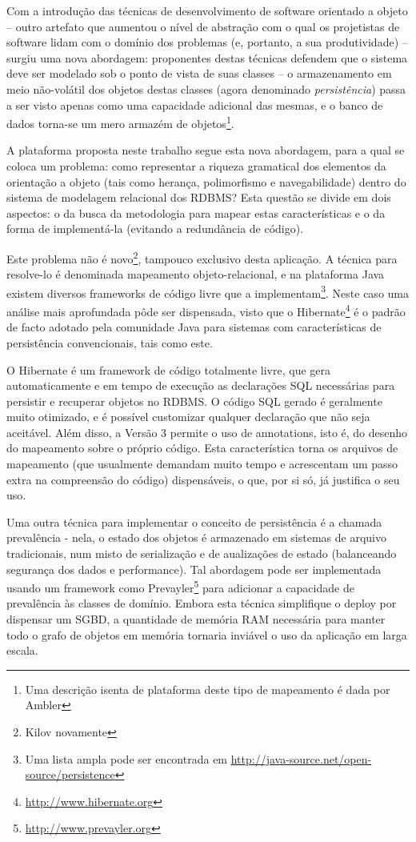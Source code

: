 \documentclass{abnt}
\begin{document}
Com a introdução das técnicas de desenvolvimento de software orientado a objeto – outro artefato que aumentou o nível de abstração com o qual os projetistas de software lidam com o domínio dos problemas (e, portanto, a sua produtividade) – surgiu uma nova abordagem: proponentes destas técnicas defendem que o sistema deve ser modelado sob o ponto de vista de suas classes – o armazenamento em meio não-volátil dos objetos destas classes (agora denominado \textit{persistência}) passa a ser visto apenas como uma capacidade adicional das mesmas, e o banco de dados torna-se um mero armazém de objetos\footnote{Uma descrição isenta de plataforma deste tipo de mapeamento é dada por Ambler\cite{web:ambler}}.

A plataforma proposta neste trabalho segue esta nova abordagem, para a qual se coloca um problema: como representar a riqueza gramatical dos elementos da orientação a objeto (tais como herança, polimorfismo e navegabilidade) dentro do sistema de modelagem relacional dos RDBMS? Esta questão se divide em dois aspectos: o da busca da metodologia para mapear estas características e o da forma de implementá-la (evitando a redundância de código).

Este problema não é novo\footnote{Kilov novamente}, tampouco exclusivo desta aplicação. A técnica para resolve-lo é denominada mapeamento objeto-relacional, e na plataforma Java existem diversos frameworks de código livre que a implementam\footnote{Uma lista ampla pode ser encontrada em \url{http://java-source.net/open-source/persistence}}. Neste caso uma análise mais aprofundada pôde ser dispensada, visto que o Hibernate\footnote{\url{http://www.hibernate.org}} é o padrão de facto adotado pela comunidade Java para sistemas com características de persistência convencionais, tais como este.

O Hibernate é um framework de código totalmente livre, que gera automaticamente e em tempo de execução as declarações SQL necessárias para persistir e recuperar objetos no RDBMS. O código SQL gerado é geralmente muito otimizado, e é possível customizar qualquer declaração que não seja aceitável. Além disso, a Versão 3 permite o uso de annotations, isto é, do desenho do mapeamento sobre o próprio código. Esta característica torna os arquivos de mapeamento (que usualmente demandam muito tempo e acrescentam um passo extra na compreensão do código) dispensáveis, o que, por si só, já justifica o seu uso.

Uma outra técnica para implementar o conceito de persistência é a chamada prevalência - nela, o estado dos objetos é armazenado em sistemas de arquivo tradicionais, num misto de serialização e de aualizações de estado (balanceando segurança dos dados e performance). Tal abordagem pode ser implementada usando um framework como Prevayler\footnote{\url{http://www.prevayler.org}} para adicionar a capacidade de prevalência às classes de domínio. Embora esta técnica simplifique o deploy por dispensar um SGBD, a quantidade de memória RAM necessária para manter todo o grafo de objetos em memória tornaria inviável o uso da aplicação em larga escala.
\end{document}
